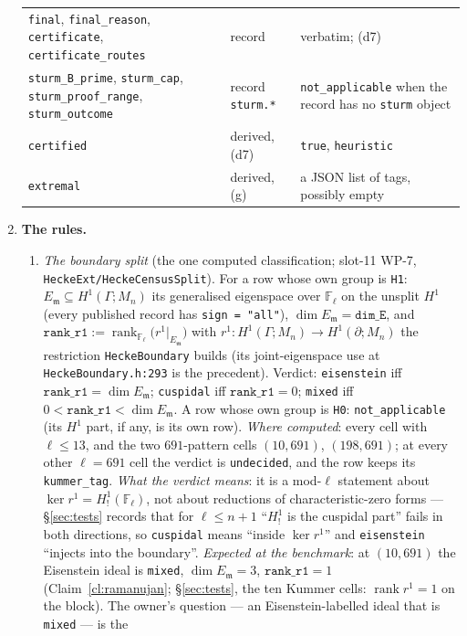 \documentclass[11pt]{article}
\theoremstyle{remark}
\newcommand{\F}{\mathbb{F}}
\newcommand{\Ga}{\Gamma}
\newcommand{\Fl}{\F_\ell}
\DeclareMathOperator{\rank}{rank}
\newcommand{\m}{\mathfrak{m}}
\newcommand{\Mn}{M_n}
\begin{document}
\begin{enumerate}[label=(\alph*)]
\begin{longtable}{@{}>{\raggedright\arraybackslash}p{3.7cm}>{\raggedright\arraybackslash}p{3.3cm}>{\raggedright\arraybackslash}p{7.2cm}@{}}
  \texttt{final}, \texttt{final\_reason}, \texttt{certificate}, \texttt{certificate\_routes} & record & verbatim; (d7) \\
  \texttt{sturm\_B\_prime}, \texttt{sturm\_cap}, \texttt{sturm\_proof\_range}, \texttt{sturm\_outcome} & record \texttt{sturm.*} & \texttt{not\_applicable} when the record has no \texttt{sturm} object \\
  \texttt{certified} & derived, (d7) & \texttt{true}, \texttt{heuristic} \\
  \texttt{extremal} & derived, (g) & a JSON list of tags, possibly empty \\
  \bottomrule
  \end{longtable}
  \endgroup
\item \textbf{The rules.}
  \begin{enumerate}[label=(d\arabic*)]
  \item \emph{The boundary split} (the one computed classification; slot-11 WP-7,
    \texttt{HeckeExt/HeckeCensusSplit}). For a row whose own group is \texttt{H1}: $E_\m\subseteq
    H^1(\Ga;\Mn)$ its generalised eigenspace over $\Fl$ on the unsplit $H^1$ (every published record
    has \texttt{sign = "all"}), $\dim E_\m=\texttt{dim\_E}$, and
    $\texttt{rank\_r1}:=\rank_{\Fl}\big(r^1|_{E_\m}\big)$ with $r^1:H^1(\Ga;\Mn)\to H^1(\partial;\Mn)$
    the restriction \texttt{HeckeBoundary} builds (its joint-eigenspace use at
    \texttt{HeckeBoundary.h:293} is the precedent). Verdict: \texttt{eisenstein} iff
    $\texttt{rank\_r1}=\dim E_\m$; \texttt{cuspidal} iff $\texttt{rank\_r1}=0$; \texttt{mixed} iff
    $0<\texttt{rank\_r1}<\dim E_\m$. A row whose own group is \texttt{H0}: \texttt{not\_applicable}
    (its $H^1$ part, if any, is its own row). \emph{Where computed}: every cell with $\ell\le13$, and
    the two $691$-pattern cells $(10,691)$, $(198,691)$; at every other $\ell=691$ cell the verdict
    is \texttt{undecided}, and the row keeps its \texttt{kummer\_tag}. \emph{What the verdict
    means}: it is a mod-$\ell$ statement about $\ker r^1=H^1_!(\Fl)$, not about reductions of
    characteristic-zero forms --- \S\ref{sec:tests} records that for $\ell\le n+1$ ``$H^1_!$ is the
    cuspidal part'' fails in both directions, so \texttt{cuspidal} means ``inside $\ker r^1$'' and
    \texttt{eisenstein} ``injects into the boundary''. \emph{Expected at the benchmark}: at
    $(10,691)$ the Eisenstein ideal is \texttt{mixed}, $\dim E_\m=3$, $\texttt{rank\_r1}=1$
    (Claim~\ref{cl:ramanujan}; \S\ref{sec:tests}, the ten Kummer cells: $\rank r^1=1$ on the
    block). The owner's question --- an Eisenstein-labelled ideal that is \texttt{mixed} --- is the

\end{enumerate}
\end{enumerate}
\end{document}
